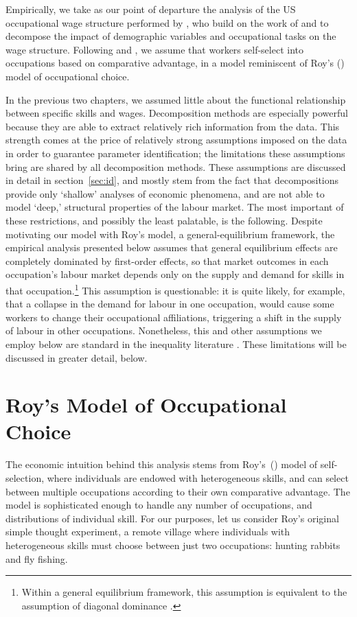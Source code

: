 Empirically, we take as our point of departure the analysis of the US occupational wage structure performed by \citet{Fortin2011}, who build on the work of \citet{Oaxaca1973} and \citet{Juhn1993} to decompose the impact of demographic variables and occupational tasks on the wage structure. Following \citet{Autor2012} and \citet{Fortin2011}, we assume that workers self-select into occupations based on comparative advantage, in a model reminiscent of Roy's (\citeyear{Roy1951}) model of occupational choice.

In the previous two chapters, we assumed little about the functional relationship between specific skills and wages. Decomposition methods are especially powerful because they are able to extract relatively rich information from the data. This strength comes at the price of relatively strong assumptions imposed on the data in order to guarantee parameter identification; the limitations these assumptions bring are shared by all decomposition methods. These assumptions are discussed in detail in section~\ref{sec:id}, and mostly stem from the fact that decompositions provide only `shallow' analyses of economic phenomena, and are not able to model `deep,' structural properties of the labour market. The most important of these restrictions, and possibly the least palatable, is the following. Despite motivating our model with Roy's model, a general-equilibrium framework, the empirical analysis presented below assumes that general equilibrium effects are completely dominated by first-order effects, so that market outcomes in each occupation's labour market depends only on the supply and demand for skills in that occupation.\footnote{Within a general equilibrium framework, this assumption is equivalent to the assumption of diagonal dominance \citep[p.233]{Arrow1971}.} This assumption is questionable: it is quite likely, for example, that a collapse in the demand for labour in one occupation, would cause some workers to change their occupational affiliations, triggering a shift in the supply of labour in other occupations. Nonetheless, this and other assumptions we employ below are standard in the inequality literature \citep[p.1]{Fortin2011}. These limitations will be discussed in greater detail, below.

\section{Roy's Model of Occupational Choice}
The economic intuition behind this analysis stems from Roy's~(\citeyear{Roy1951}) model of self-selection, where individuals are endowed with heterogeneous skills, and can select between multiple occupations according to their own comparative advantage. The model is sophisticated enough to handle any number of occupations, and distributions of individual skill. For our purposes, let us consider Roy's original simple thought experiment, a remote village where individuals with heterogeneous skills must choose between just two occupations: hunting rabbits and fly fishing. 

